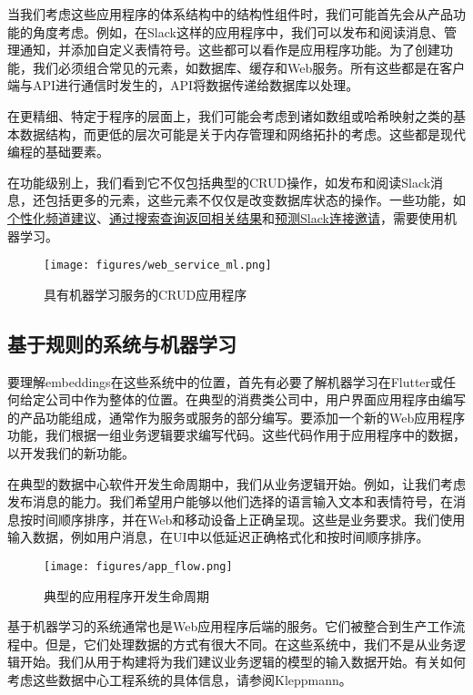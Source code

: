 \documentclass[Chinese, 11pt, table]{diazessay} %
\begin{document}
\begin{CJK}{UTF8}{gbsn}
\begin{sloppypar}
当我们考虑这些应用程序的体系结构中的结构性组件时，我们可能首先会从产品功能的角度考虑。例如，在Slack这样的应用程序中，我们可以发布和阅读消息、管理通知，并添加自定义表情符号。这些都可以看作是应用程序功能。为了创建功能，我们必须组合常见的元素，如数据库、缓存和Web服务。所有这些都是在客户端与API进行通信时发生的，API将数据传递给数据库以处理。

在更精细、特定于程序的层面上，我们可能会考虑到诸如数组或哈希映射之类的基本数据结构，而更低的层次可能是关于内存管理和网络拓扑的考虑。这些都是现代编程的基础要素。

在功能级别上，我们看到它不仅包括典型的CRUD操作，如发布和阅读Slack消息，还包括更多的元素，这些元素不仅仅是改变数据库状态的操作。一些功能，如\href{https://slack.engineering/personalized-channel-recommendations-in-slack/}{个性化频道建议}、\href{https://slack.engineering/search-at-slack/}{通过搜索查询返回相关结果}和\href{https://slack.engineering/email-classification/}{预测Slack连接邀请}，需要使用机器学习。

\begin{figure}[H]
\centering
\texttt{[image: figures/web\_service\_ml.png]}
\caption{具有机器学习服务的CRUD应用程序}
\end{figure}

\subsection{基于规则的系统与机器学习}

要理解embeddings在这些系统中的位置，首先有必要了解机器学习在Flutter或任何给定公司中作为整体的位置。在典型的消费类公司中，用户界面应用程序由编写的产品功能组成，通常作为服务或服务的部分编写。要添加一个新的Web应用程序功能，我们根据一组业务逻辑要求编写代码。这些代码作用于应用程序中的数据，以开发我们的新功能。

在典型的数据中心软件开发生命周期中，我们从业务逻辑开始。例如，让我们考虑发布消息的能力。我们希望用户能够以他们选择的语言输入文本和表情符号，在消息按时间顺序排序，并在Web和移动设备上正确呈现。这些是业务要求。我们使用输入数据，例如用户消息，在UI中以低延迟正确格式化和按时间顺序排序。

\begin{figure}[H]
\centering
\texttt{[image: figures/app\_flow.png]}
\caption{典型的应用程序开发生命周期}
\end{figure}

基于机器学习的系统通常也是Web应用程序后端的服务。它们被整合到生产工作流程中。但是，它们处理数据的方式有很大不同。在这些系统中，我们不是从业务逻辑开始。我们从用于构建将为我们建议业务逻辑的模型的输入数据开始。有关如何考虑这些数据中心工程系统的具体信息，请参阅Kleppmann\cite{kleppmann2017designing}。


\end{sloppypar}
\end{CJK}
\end{document}
